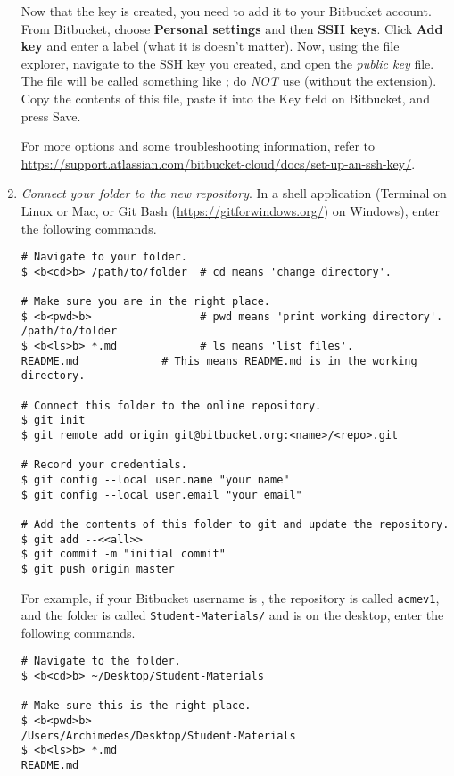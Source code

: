 \begin{enumerate}
Now that the key is created, you need to add it to your Bitbucket account.
From Bitbucket, choose \textbf{Personal settings} and then \textbf{SSH keys}.
Click \textbf{Add key} and enter a label (what it is doesn't matter).
Now, using the file explorer, navigate to the SSH key you created, and open the \emph{public key} file.
The file will be called something like ; do \emph{NOT} use  (without the  extension).
Copy the contents of this file, paste it into the Key field on Bitbucket, and press Save.

For more options and some troubleshooting information, refer to \url{https://support.atlassian.com/bitbucket-cloud/docs/set-up-an-ssh-key/}.

\item \emph{Connect your folder to the new repository}.
\label{step:connect-folder}
In a shell application (Terminal on Linux or Mac, or Git Bash (\url{https://gitforwindows.org/}) on Windows), enter the following commands.

\begin{lstlisting}
# Navigate to your folder.
$ <b<cd>b> /path/to/folder  # cd means 'change directory'.

# Make sure you are in the right place.
$ <b<pwd>b>                 # pwd means 'print working directory'.
/path/to/folder
$ <b<ls>b> *.md             # ls means 'list files'.
README.md             # This means README.md is in the working directory.

# Connect this folder to the online repository.
$ git init
$ git remote add origin git@bitbucket.org:<name>/<repo>.git

# Record your credentials.
$ git config --local user.name "your name"
$ git config --local user.email "your email"

# Add the contents of this folder to git and update the repository.
$ git add --<<all>>
$ git commit -m "initial commit"
$ git push origin master
\end{lstlisting}

For example, if your Bitbucket username is , the repository is called \texttt{acmev1}, and the folder is called \texttt{Student-Materials/} and is on the desktop, enter the following commands.

\begin{lstlisting}
# Navigate to the folder.
$ <b<cd>b> ~/Desktop/Student-Materials

# Make sure this is the right place.
$ <b<pwd>b>
/Users/Archimedes/Desktop/Student-Materials
$ <b<ls>b> *.md
README.md


\end{lstlisting}
\end{enumerate}
